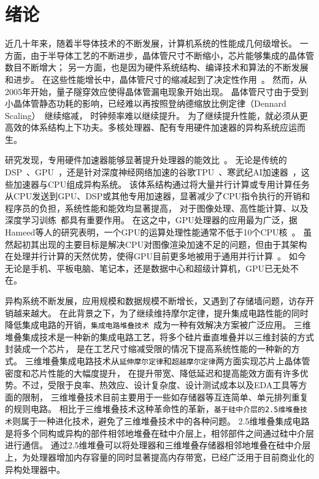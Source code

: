 \chapter{绪论}
\label{chap:intro}
近几十年来，随着半导体技术的不断发展，计算机系统的性能成几何级增长。
一方面，由于半导体工艺的不断进步，晶体管尺寸不断缩小，芯片能够集成的晶体管数目不断增大；
另一方面，也是因为硬件系统结构、编译技术和算法的不断发展和进步。
在这些性能增长中，晶体管尺寸的缩减起到了决定性作用~。
然而，从2005年开始，量子隧穿效应使得晶体管漏电现象开始出现。
晶体管尺寸由于受到小晶体管静态功耗的影响，已经难以再按照登纳德缩放比例定律（Dennard Scaling）~继续缩减，
时钟频率难以继续提升。
为了继续提升性能，就必须从更高效的体系结构上下功夫。多核处理器、配有专用硬件加速器的异构系统应运而生。

研究发现，专用硬件加速器能够显著提升处理器的能效比~。 
无论是传统的DSP~、GPU~，还是针对深度神经网络加速的谷歌TPU~、寒武纪AI加速器~，这些加速器与CPU组成异构系统。
该体系结构通过将大量并行计算或专用计算任务从CPU发送到GPU、DSP或其他专用加速器，显著减少了CPU指令执行的开销和程序员的负担，系统性能和能效均显著提高，
对于图像处理、高性能计算、以及深度学习训练~都具有重要作用。
在这之中，GPU处理器的应用最为广泛，据Hameed等人的研究表明，一个GPU的运算处理性能通常不低于10个CPU核~。
虽然起初其出现的主要目标是解决CPU对图像渲染加速不足的问题，但由于其架构在处理并行计算的天然优势，使得GPU目前更多地被用于通用并行计算~。
如今无论是手机、平板电脑、笔记本，还是数据中心和超级计算机，GPU已无处不在。

异构系统不断发展，应用规模和数据规模不断增长，又遇到了存储墙问题，访存开销越来越大。
在此背景之下，为了继续维持摩尔定律，提升集成电路性能的同时降低集成电路的开销，\texttt{集成电路堆叠技术}~成为一种有效解决方案被广泛应用。
三维堆叠集成技术是一种新的集成电路工艺，将多个硅片垂直堆叠并以三维封装的方式封装成一个芯片，
是在工艺尺寸缩减受限的情况下提高系统性能的一种新的方式。
三维堆叠集成电路技术从\texttt{延伸摩尔定律}和\texttt{超越摩尔定律}两方面实现芯片上晶体管密度和芯片性能的大幅度提升，
在提升带宽、降低延迟和提高能效方面有许多优势。不过，受限于良率、热效应、设计复杂度、设计测试成本以及EDA工具等方面的限制，
三维堆叠技术目前主要用于一些如存储器等互连简单、单元排列重复的规则电路。
相比于三维堆叠技术这种革命性的革新，\texttt{基于硅中介层的2.5维堆叠技术}则属于一种进化技术，避免了三维堆叠技术中的各种问题。
2.5维堆叠集成电路是将多个同构或异构的部件相邻地堆叠在硅中介层上，相邻部件之间通过硅中介层进行通信。
通过2.5维堆叠可以将处理器和三维堆叠存储器相邻地堆叠在硅中介层上，为处理器增加内存容量的同时显著提高内存带宽，已经广泛用于目前商业化的异构处理器中。


